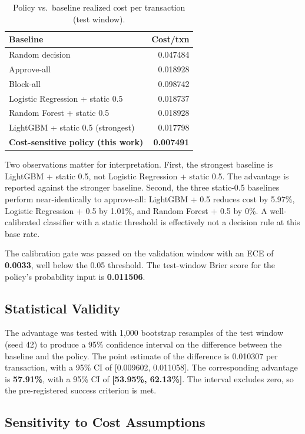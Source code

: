 \documentclass[conference]{IEEEtran}
\begin{document}
\begin{table}[!t]
\caption{Policy vs.\ baseline realized cost per transaction (test window).}
\label{tab:baselines}
\centering
\begin{tabular}{lr}
\toprule
Baseline & Cost/txn \\
\midrule
Random decision & 0.047484 \\
Approve-all & 0.018928 \\
Block-all & 0.098742 \\
Logistic Regression + static 0.5 & 0.018737 \\
Random Forest + static 0.5 & 0.018928 \\
LightGBM + static 0.5 (strongest) & 0.017798 \\
\textbf{Cost-sensitive policy (this work)} & \textbf{0.007491} \\
\bottomrule
\end{tabular}
\end{table}

Two observations matter for interpretation. First, the strongest baseline
is LightGBM + static 0.5, not Logistic Regression + static 0.5. The
advantage is reported against the stronger baseline. Second, the three
static-0.5 baselines perform near-identically to approve-all: LightGBM +
0.5 reduces cost by 5.97\%, Logistic Regression + 0.5 by 1.01\%, and
Random Forest + 0.5 by 0\%. A well-calibrated classifier with a static
threshold is effectively not a decision rule at this base rate.

The calibration gate was passed on the validation window with an ECE of
\textbf{0.0033}, well below the 0.05 threshold. The test-window Brier score
for the policy's probability input is \textbf{0.011506}.

\subsection{Statistical Validity}

The advantage was tested with 1,000 bootstrap resamples of the test window
(seed 42) to produce a 95\% confidence interval on the difference between
the baseline and the policy. The point estimate of the difference is
0.010307 per transaction, with a 95\% CI of [0.009602, 0.011058]. The
corresponding advantage is \textbf{57.91\%}, with a 95\% CI of
\textbf{[53.95\%, 62.13\%]}. The interval excludes zero, so the
pre-registered success criterion is met.

\subsection{Sensitivity to Cost Assumptions}
\end{document}
